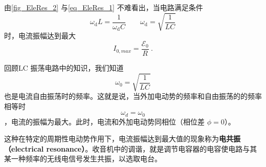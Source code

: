 由\autoref{fig_EleRes_2} 与\autoref{eq_EleRes_1} 不难看出，当电路满足条件
\begin{equation}
\omega_{\mathrm{d}} L=\dfrac{1}{\omega_{\mathrm{d}} C}
\qquad 
\omega_{\mathrm{d}}=\sqrt{\frac{1}{L C}}
\end{equation}
时，电流振幅达到最大
$$I_{0,max}=\dfrac{\mathscr{E}_{0}}{R}~.$$

回顾LC 振荡电路中的知识，我们知道$$\omega_0 = \sqrt{\frac{1}{LC}}$$也是电流自由振荡时的频率。这就是说，当外加电动势的频率和自由振荡的的频率相等时$$\omega_d=\omega_0$$，电流的振幅为最大。此时，电流和外加电动势同相位（相位差 $\phi=0$）。

这种在特定的周期性电动势作用下，电流振幅达到最大值的现象称为\textbf{电共振（electrical resonance）}。收音机中的调谐，就是调节电容器的电容使电路与其某一种频率的无线电信号发生共振，以选取电台。
